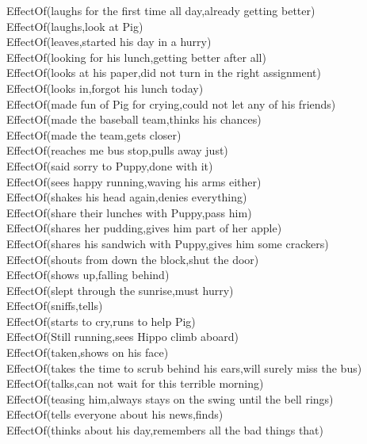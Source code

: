 \begin{multicols}{2}
\begin{footnotesize}
EffectOf(laughs for the first time all day,already getting better) \\
EffectOf(laughs,look at Pig) \\
EffectOf(leaves,started his day in a hurry) \\
EffectOf(looking for his lunch,getting better after all) \\
EffectOf(looks at his paper,did not turn in the right assignment) \\
EffectOf(looks in,forgot his lunch today) \\
EffectOf(made fun of Pig for crying,could not let any of his friends) \\
EffectOf(made the baseball team,thinks his chances) \\
EffectOf(made the team,gets closer) \\
EffectOf(reaches me bus stop,pulls away just) \\
EffectOf(said sorry to Puppy,done with it) \\
EffectOf(sees happy running,waving his arms either) \\
EffectOf(shakes his head again,denies everything) \\
EffectOf(share their lunches with Puppy,pass him) \\
EffectOf(shares her pudding,gives him part of her apple) \\
EffectOf(shares his sandwich with Puppy,gives him some crackers) \\
EffectOf(shouts from down the block,shut the door) \\
EffectOf(shows up,falling behind) \\
EffectOf(slept through the sunrise,must hurry) \\
EffectOf(sniffs,tells) \\
EffectOf(starts to cry,runs to help Pig) \\
EffectOf(Still running,sees Hippo climb aboard) \\
EffectOf(taken,shows on his face) \\
EffectOf(takes the time to scrub behind his ears,will surely miss the bus) \\
EffectOf(talks,can not wait for this terrible morning) \\
EffectOf(teasing him,always stays on the swing until the bell rings) \\
EffectOf(tells everyone about his news,finds) \\
EffectOf(thinks about his day,remembers all the bad things that) \\

\end{footnotesize}
\end{multicols}
